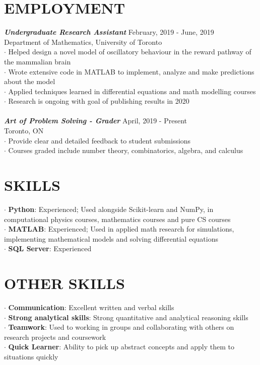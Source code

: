 \documentclass[margin]{res}
\begin{document}
\begin{resume}
\section{EMPLOYMENT}
{\sl \textbf{Undergraduate Research Assistant}} \hfill February, 2019 - June, 2019 \\
Department of Mathematics, University of Toronto  \\ 
$\cdot$ Helped design a novel model of oscillatory behaviour in the    reward pathway of the mammalian brain\\ 
$\cdot$ Wrote extensive code in MATLAB to implement, analyze and make predictions about the model\\
$\cdot$ Applied techniques learned in differential equations and math modelling courses \\
$\cdot$ Research is ongoing with goal of publishing results in 2020\\
\\
{\sl \textbf{Art of Problem Solving - Grader}} \hfill April, 2019 - Present \\
Toronto, ON \\
$\cdot$ Provide clear and detailed feedback to student submissions\\
$\cdot$ Courses graded include number theory, combinatorics, algebra, and calculus 

\section{SKILLS}
    $\cdot$ \textbf{Python}: Experienced; Used alongside Scikit-learn and NumPy, in computational physics courses, mathematics courses and pure CS courses\\
    $\cdot$ \textbf{MATLAB}: Experienced; Used in applied math research for simulations, implementing mathematical models and solving differential equations\\
    $\cdot$ \textbf{SQL Server}: Experienced\\
\section{OTHER SKILLS}
    $\cdot$ \textbf{Communication}: Excellent written and verbal skills\\
    $\cdot$ \textbf{Strong analytical skills}: Strong quantitative and analytical reasoning skills\\
    $\cdot$ \textbf{Teamwork}: Used to working in groups and collaborating with others on research projects and coursework \\
    $\cdot$ \textbf{Quick Learner}: Ability to pick up abstract concepts and apply them to situations quickly\\
\end{resume}
\end{document}
